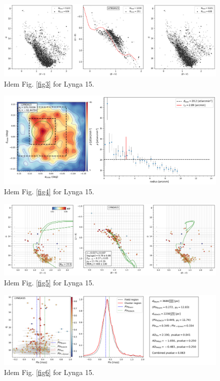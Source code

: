 \documentclass[draft]{aa}
\begin{document}
\begin{figure}[ht]
    \centering
    \includegraphics[width=\hsize]{../figs/obs_LYNGA15.png}
    \caption{Idem Fig. \ref{fig3} for Lynga 15.}
    \label{fig51}
\end{figure}
\begin{figure}[ht]
    \centering
    \includegraphics[width=\hsize]{../figs/dmap_lynga15.png}
    \caption{Idem Fig. \ref{fig4} for Lynga 15.}
    \label{fig52}
\end{figure}
\begin{figure}[ht]
    \centering
    \includegraphics[width=\hsize]{../figs/cmds_lynga15.png}
    \caption{Idem Fig. \ref{fig5} for Lynga 15.}
    \label{fig53}
\end{figure}
\begin{figure}[ht]
    \centering
    \includegraphics[width=\hsize]{../figs/plx_LYNGA15.png}
    \caption{Idem Fig. \ref{fig6} for Lynga 15.}
    \label{fig54}
\end{figure}
\end{document}
